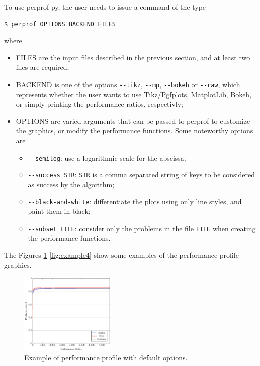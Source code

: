     To use perprof-py, the user needs to issue a command of the type
\begin{verbatim}
$ perprof OPTIONS BACKEND FILES
\end{verbatim}
    where
    \begin{itemize}
      \item FILES are the input files described in the previous section, and at
        least two files are required;
      \item BACKEND is one of the options \verb+--tikz+, \verb+--mp+,
        \verb+--bokeh+ or
        \verb+--raw+, which represents whether the user wants to use
        Tikz/Pgfplots, MatplotLib, Bokeh, or simply printing the performance
        ratios, respectivly;
      \item OPTIONS are varied arguments that can be passed to perprof to
        customize the graphics, or modify the performance functions. Some
        noteworthy options are
        \begin{itemize}
          \item \verb+--semilog+: use a logarithmic scale for the abscissa;
          \item \verb+--success STR+: \verb+STR+ is a comma separated string
            of keys to be considered as success by the algorithm;
          \item \verb+--black-and-white+: differentiate the plots using only
            line styles, and paint them in black;
          \item \verb+--subset FILE+: consider only the problems in the file
            \verb+FILE+ when creating the performance functions.
        \end{itemize}
    \end{itemize}
    The Figures \ref{fig:example1}-\ref{fig:example4} show some examples of the
    performance profile graphics.
    \begin{figure}[!ht]
      \centering
      \includegraphics[width=0.4\textwidth]{plots/abc.pdf}
      \caption{Example of performance profile with default options.}
      \label{fig:example1}
    \end{figure}
